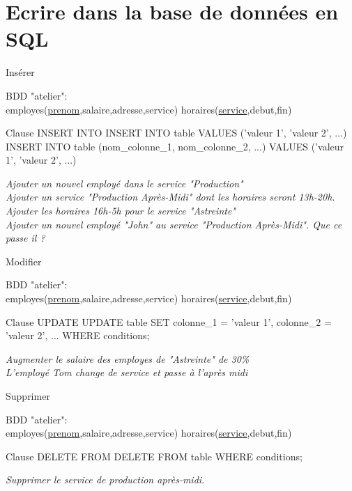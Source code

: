\documentclass[xetex,dvipsnames]{beamer}
\begin{document}
\section{Ecrire dans la base de données en SQL}
\begin{frame}[t]{Insérer}
\begin{small}
		BDD "atelier": \\employes(\underline{prenom},salaire,adresse,service) horaires(\underline{service},debut,fin)
\end{small}	
	\begin{alertblock}{Clause INSERT INTO}
	INSERT INTO table VALUES ('valeur 1', 'valeur 2', ...)\\
	INSERT INTO table (nom\_colonne\_1, nom\_colonne\_2, ...) VALUES ('valeur 1', 'valeur 2', ...)
	\end{alertblock}
		
	\textit{Ajouter un nouvel employé dans le service "Production"}\\
	\textit{Ajouter un service "Production Après-Midi" dont les horaires seront 13h-20h.}\\
	\textit{Ajouter les horaires 16h-5h pour le service "Astreinte"}\\
	\textit{Ajouter un nouvel employé "John" au service "Production Après-Midi". Que ce passe il ? }\\
\end{frame}

\begin{frame}[t]{Modifier}
	\begin{small}
		BDD "atelier": \\employes(\underline{prenom},salaire,adresse,service) horaires(\underline{service},debut,fin)
	\end{small}	
	\begin{alertblock}{Clause UPDATE}
		UPDATE table SET colonne\_1 = 'valeur 1', colonne\_2 = 'valeur 2', ... WHERE conditions;
	\end{alertblock}
	\textit{Augmenter le salaire des employes de "Astreinte" de 30\%}\\
	\textit{L'employé Tom change de service et passe à l'après midi }\\
\end{frame}

\begin{frame}[t]{Supprimer}
	\begin{small}
		BDD "atelier": \\employes(\underline{prenom},salaire,adresse,service) horaires(\underline{service},debut,fin)
	\end{small}	
	\begin{alertblock}{Clause DELETE FROM}
		DELETE FROM table WHERE conditions;
	\end{alertblock}
	\textit{Supprimer le service de production après-midi.}\\
\end{frame}
\end{document}
